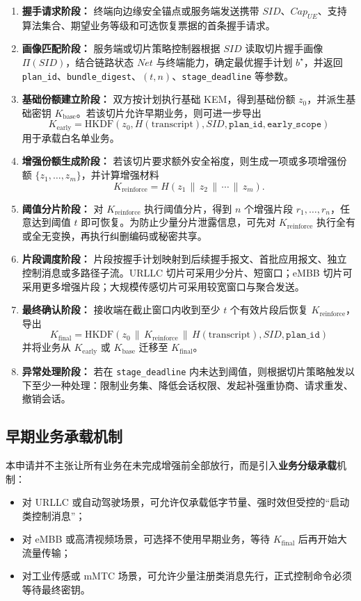 \documentclass[12pt,a4paper]{article}
\newcommand{\Kearly}{K_{\mathrm{early}}}
\newcommand{\Kfinal}{K_{\mathrm{final}}}
\newcommand{\Kbase}{K_{\mathrm{base}}}
\newcommand{\Krein}{K_{\mathrm{reinforce}}}
\begin{document}
\begin{enumerate}[leftmargin=2em]
    \item \textbf{握手请求阶段：} 终端向边缘安全锚点或服务端发送携带 $SID$、$Cap_{UE}$、支持算法集合、期望业务等级和可选恢复票据的首条握手请求。
    \item \textbf{画像匹配阶段：} 服务端或切片策略控制器根据 $SID$ 读取切片握手画像 $\Pi(SID)$，结合链路状态 $Net$ 与终端能力，确定最优握手计划 $b^\star$，并返回 \texttt{plan\_id}、\texttt{bundle\_digest}、$(t,n)$、\texttt{stage\_deadline} 等参数。
    \item \textbf{基础份额建立阶段：} 双方按计划执行基础 KEM，得到基础份额 $z_0$，并派生基础密钥 $\Kbase$。若该切片允许早期业务，则可进一步导出
    \[
    \Kearly = \mathrm{HKDF}(z_0, H(\mathrm{transcript}), SID, \texttt{plan\_id}, \texttt{early\_scope})
    \]
    用于承载白名单业务。
    \item \textbf{增强份额生成阶段：} 若该切片要求额外安全裕度，则生成一项或多项增强份额 $\{z_1,\dots,z_m\}$，并计算增强材料
    \[
    \Krein = H(z_1 \,\|\, z_2 \,\|\, \cdots \,\|\, z_m).
    \]
    \item \textbf{阈值分片阶段：} 对 $\Krein$ 执行阈值分片，得到 $n$ 个增强片段 $r_1,\dots,r_n$，任意达到阈值 $t$ 即可恢复。为防止少量分片泄露信息，可先对 $\Krein$ 执行全有或全无变换，再执行纠删编码或秘密共享。
    \item \textbf{片段调度阶段：} 片段按握手计划映射到后续握手报文、首批应用报文、独立控制消息或多路径子流。URLLC 切片可采用少分片、短窗口；eMBB 切片可采用更多增强片段；大规模传感切片可采用较宽窗口与聚合发送。
    \item \textbf{最终确认阶段：} 接收端在截止窗口内收到至少 $t$ 个有效片段后恢复 $\Krein$，导出
    \[
    \Kfinal=\mathrm{HKDF}(z_0 \,\|\, \Krein \,\|\, H(\mathrm{transcript}), SID, \texttt{plan\_id})
    \]
    并将业务从 $\Kearly$ 或 $\Kbase$ 迁移至 $\Kfinal$。
    \item \textbf{异常处理阶段：} 若在 \texttt{stage\_deadline} 内未达到阈值，则根据切片策略触发以下至少一种处理：限制业务集、降低会话权限、发起补强重协商、请求重发、撤销会话。
\end{enumerate}

\subsection{早期业务承载机制}

本申请并不主张让所有业务在未完成增强前全部放行，而是引入\textbf{业务分级承载}机制：

\begin{itemize}[leftmargin=2em]
    \item 对 URLLC 或自动驾驶场景，可允许仅承载低字节量、强时效但受控的“启动类控制消息”；
    \item 对 eMBB 或高清视频场景，可选择不使用早期业务，等待 $\Kfinal$ 后再开始大流量传输；
    \item 对工业传感或 mMTC 场景，可允许少量注册类消息先行，正式控制命令必须等待最终密钥。
\end{itemize}
\end{document}
